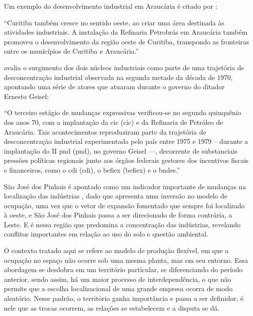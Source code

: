 	Um exemplo do desenvolvimento industrial em Araucária é citado por :
	
	\begin{citacao}
		``Curitiba também cresce no sentido oeste, ao criar uma área destinada às atividades industriais. A instalação da Refinaria Petrobrás em Araucária também promoveu o desenvolvimento da região oeste de Curitiba, transpondo as fronteiras entre os municípios de Curitiba e Araucária.''
	\end{citacao}
	
	 avalia o surgimento dos dois núcleos industriais como parte de uma trajetória de desconcentração industrial observada na segunda metade da década de 1970, apontando uma série de atores que atuaram durante o governo do ditador Ernesto Geisel:
	
	\begin{citacao}
		``O terceiro estágio de mudanças expressivas verificou-se no segundo quinquênio dos anos 70, com a implantação da \glsdesc{cic} (\gls{cic}) e da Refinaria de Petróleo de Araucária. Tais acontecimentos reproduziram parte da trajetória de desconcentração industrial experimentada pelo país entre 1975 e 1979 – durante a implantação do II \glsdesc{pnd} (\gls{pnd}), no governo Geisel ---, decorrente de substanciais pressões políticas regionais junto aos órgãos federais gestores dos incentivos fiscais e financeiros, como o \glsdesc{cdi} (\gls{cdi}), o \glsdesc{befiex}
		(\gls{befiex}) e o \gls{bndes}.'' \cite[p. 62]{lourenco2009a}
	\end{citacao}

	São José dos Pinhais é apontado como um indicador importante de mudanças na localização das indústrias \cite{firkowski2002b}, dado que apresenta uma inversão no modelo de ocupação, uma vez que o vetor de expansão fomentado que sempre foi localizado à oeste, e São José dos Pinhais passa a ser direcionado de forma contrária, a Leste. E é nessa região que predomina a concentração das indústrias, revelando conflitos importantes em relação ao uso do solo e questão ambiental.

	O contexto tratado aqui se refere ao modelo de produção flexível, em que a ocupação no espaço não ocorre sob uma mesma planta, mas em seu entorno. Essa abordagem se desdobra em um território particular, se diferenciando do período anterior, sendo assim, há um maior processo de interdependência, o que não permite que a escolha localizacional de uma grande empresa ocorra de modo aleatório. Nesse padrão, o território ganha importância e passa a ser definidor, é nele que as trocas ocorrem, as relações se estabelecem e a disputa se dá. 
	
